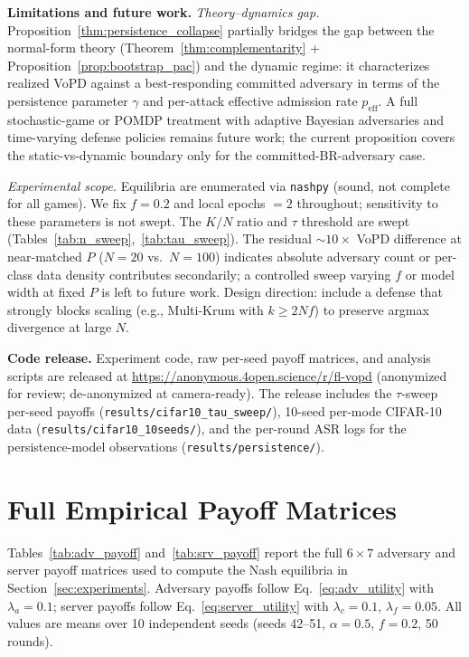 \documentclass{article}
\begin{document}
\textbf{Limitations and future work.} \emph{Theory--dynamics gap.} Proposition~\ref{thm:persistence_collapse} partially bridges the gap between the normal-form theory (Theorem~\ref{thm:complementarity} + Proposition~\ref{prop:bootstrap_pac}) and the dynamic regime: it characterizes realized VoPD against a best-responding committed adversary in terms of the persistence parameter $\gamma$ and per-attack effective admission rate $p_{\mathrm{eff}}$. A full stochastic-game or POMDP treatment with adaptive Bayesian adversaries and time-varying defense policies remains future work; the current proposition covers the static-vs-dynamic boundary only for the committed-BR-adversary case.

\emph{Experimental scope.} Equilibria are enumerated via \texttt{nashpy} (sound, not complete for all games). We fix $f=0.2$ and local epochs $= 2$ throughout; sensitivity to these parameters is not swept. The $K/N$ ratio and $\tau$ threshold are swept (Tables~\ref{tab:n_sweep},~\ref{tab:tau_sweep}). The residual ${\sim}10{\times}$ VoPD difference at near-matched $P$ ($N{=}20$ vs.\ $N{=}100$) indicates absolute adversary count or per-class data density contributes secondarily; a controlled sweep varying $f$ or model width at fixed $P$ is left to future work. Design direction: include a defense that strongly blocks scaling (e.g., Multi-Krum with $k \geq 2Nf$) to preserve argmax divergence at large $N$.

\textbf{Code release.} Experiment code, raw per-seed payoff matrices, and analysis scripts are released at \url{https://anonymous.4open.science/r/fl-vopd} (anonymized for review; de-anonymized at camera-ready). The release includes the $\tau$-sweep per-seed payoffs (\texttt{results/cifar10\_tau\_sweep/}), 10-seed per-mode CIFAR-10 data (\texttt{results/cifar10\_10seeds/}), and the per-round ASR logs for the persistence-model observations (\texttt{results/persistence/}).




\appendix
\section{Full Empirical Payoff Matrices}
\label{app:payoff}

Tables~\ref{tab:adv_payoff} and~\ref{tab:srv_payoff} report the full $6 \times 7$ adversary and server payoff matrices used to compute the Nash equilibria in Section~\ref{sec:experiments}. Adversary payoffs follow Eq.~\ref{eq:adv_utility} with $\lambda_a = 0.1$; server payoffs follow Eq.~\ref{eq:server_utility} with $\lambda_c = 0.1$, $\lambda_f = 0.05$. All values are means over 10 independent seeds (seeds 42--51, $\alpha=0.5$, $f=0.2$, 50 rounds).
\end{document}
